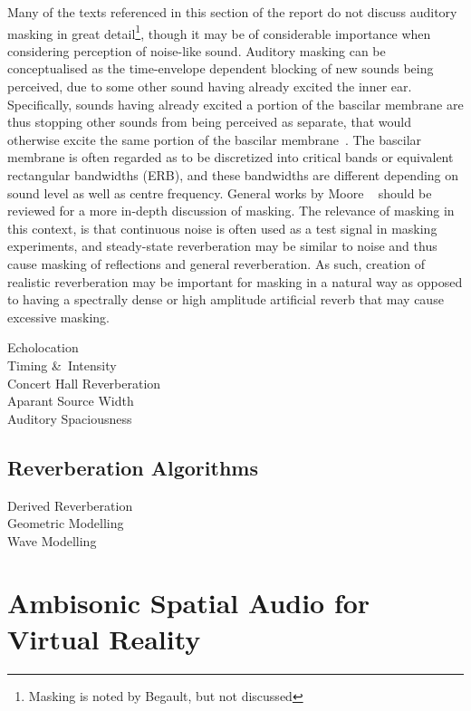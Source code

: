 \documentclass[paper=a4, fontsize=10pt, font=arial]{scrartcl} %
\numberwithin{equation}{section} %
\numberwithin{figure}{section} %
\numberwithin{table}{section} %
\begin{document}
Many of the texts referenced in this section of the report do not discuss auditory masking in great detail\footnote{Masking is noted by Begault, but not discussed}, though it may be of considerable importance when considering perception of noise-like sound. Auditory masking can be conceptualised as the time-envelope dependent blocking of new sounds being perceived, due to some other sound having already excited the inner ear. Specifically, sounds having already excited a portion of the bascilar membrane are thus stopping other sounds from being perceived as separate, that would otherwise excite the same portion of the bascilar membrane~\cite{Everest2009}. The bascilar membrane is often regarded as to be discretized into critical bands or equivalent rectangular bandwidths (ERB), and these bandwidths are different depending on sound level as well as centre frequency. General works by Moore ~\cite{Moore1996} should be reviewed for a more in-depth discussion of masking. The relevance of masking in this context, is that continuous noise is often used as a test signal in masking experiments, and steady-state reverberation may be similar to noise and thus cause masking of reflections and general reverberation. As such, creation of realistic reverberation may be important for masking in a natural way as opposed to having a spectrally dense or high amplitude artificial reverb that may cause excessive masking.

Echolocation\\

Timing \&\ Intensity\\

Concert Hall Reverberation\\

Aparant Source Width\\

Auditory Spaciousness\\

\subsection{Reverberation Algorithms}

Derived Reverberation\\

Geometric Modelling\\

Wave Modelling\\

\section{Ambisonic Spatial Audio for Virtual Reality}
\end{document}
